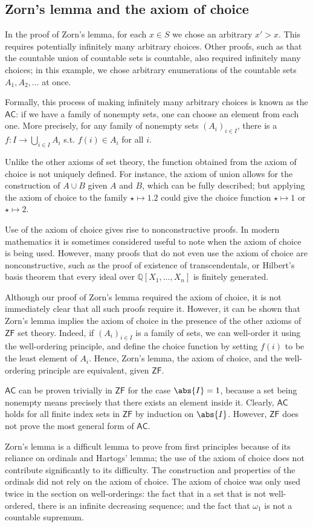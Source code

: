 \subsection{Zorn's lemma and the axiom of choice}
In the proof of Zorn's lemma, for each $x \in S$ we chose an arbitrary $x' > x$.
This requires potentially infinitely many arbitrary choices.
Other proofs, such as that the countable union of countable sets is countable, also required infinitely many choices; in this example, we chose arbitrary enumerations of the countable sets $A_1, A_2, \dots$ at once.

Formally, this process of making infinitely many arbitrary choices is known as the  $\mathsf{AC}$: if we have a family of nonempty sets, one can choose an element from each one.
More precisely, for any family of nonempty sets $(A_i)_{i \in I}$, there is a  $f \colon I \to \bigcup_{i \in I} A_i$ s.t. $f(i) \in A_i$ for all $i$.

Unlike the other axioms of set theory, the function obtained from the axiom of choice is not uniquely defined.
For instance, the axiom of union allows for the construction of $A \cup B$ given $A$ and $B$, which can be fully described; but applying the axiom of choice to the family $\star \mapsto \qty{1, 2}$ could give the choice function $\star \mapsto 1$ or $\star \mapsto 2$.

Use of the axiom of choice gives rise to nonconstructive proofs.
In modern mathematics it is sometimes considered useful to note when the axiom of choice is being used.
However, many proofs that do not even use the axiom of choice are nonconstructive, such as the proof of existence of transcendentals, or Hilbert's basis theorem that every ideal over $\mathbb Q[X_1, \dots, X_n]$ is finitely generated.

Although our proof of Zorn's lemma required the axiom of choice, it is not immediately clear that all such proofs require it.
However, it can be shown that Zorn's lemma implies the axiom of choice in the presence of the other axioms of $\mathsf{ZF}$ set theory.
Indeed, if $(A_i)_{i \in I}$ is a family of sets, we can well-order it using the well-ordering principle, and define the choice function by setting $f(i)$ to be the least element of $A_i$.
Hence, Zorn's lemma, the axiom of choice, and the well-ordering principle are equivalent, given $\mathsf{ZF}$.

$\mathsf{AC}$ can be proven trivially in $\mathsf{ZF}$ for the case $\abs{I} = 1$, because a set being nonempty means precisely that there exists an element inside it.
Clearly, $\mathsf{AC}$ holds for all finite index sets in $\mathsf{ZF}$ by induction on $\abs{I}$.
However, $\mathsf{ZF}$ does not prove the most general form of $\mathsf{AC}$.

Zorn's lemma is a difficult lemma to prove from first principles because of its reliance on ordinals and Hartogs' lemma; the use of the axiom of choice does not contribute significantly to its difficulty.
The construction and properties of the ordinals did not rely on the axiom of choice.
The axiom of choice was only used twice in the section on well-orderings: the fact that in a set that is not well-ordered, there is an infinite decreasing sequence; and the fact that $\omega_1$ is not a countable supremum.
